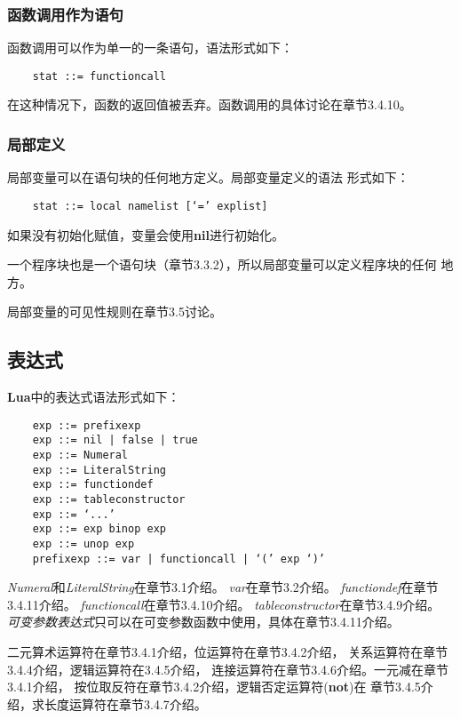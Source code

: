\documentclass{ctexart}
\begin{document}
\subsubsection{函数调用作为语句}

函数调用可以作为单一的一条语句，语法形式如下：

\lstset{language=C}
\begin{lstlisting}
	stat ::= functioncall
\end{lstlisting}

在这种情况下，函数的返回值被丢弃。函数调用的具体讨论在章节3.4.10。

\subsubsection{局部定义}

局部变量可以在语句块的任何地方定义。局部变量定义的语法
形式如下：

\lstset{language=C}
\begin{lstlisting}
	stat ::= local namelist [‘=’ explist]
\end{lstlisting}

如果没有初始化赋值，变量会使用\textbf{nil}进行初始化。

一个程序块也是一个语句块（章节3.3.2），所以局部变量可以定义程序块的任何
地方。

局部变量的可见性规则在章节3.5讨论。

\subsection{表达式}

\textbf{Lua}中的表达式语法形式如下：

\lstset{language=C}
\begin{lstlisting}
	exp ::= prefixexp
	exp ::= nil | false | true
	exp ::= Numeral
	exp ::= LiteralString
	exp ::= functiondef
	exp ::= tableconstructor
	exp ::= ‘...’
	exp ::= exp binop exp
	exp ::= unop exp
	prefixexp ::= var | functioncall | ‘(’ exp ‘)’
\end{lstlisting}

\emph{Numeral}和\emph{LiteralString}在章节3.1介绍。
\emph{var}在章节3.2介绍。
\emph{functiondef}在章节3.4.11介绍。
\emph{functioncall}在章节3.4.10介绍。
\emph{tableconstructor}在章节3.4.9介绍。
\emph{可变参数表达式}只可以在可变参数函数中使用，具体在章节3.4.11介绍。

二元算术运算符在章节3.4.1介绍，位运算符在章节3.4.2介绍，
关系运算符在章节3.4.4介绍，逻辑运算符在3.4.5介绍，
连接运算符在章节3.4.6介绍。一元减在章节3.4.1介绍，
按位取反符在章节3.4.2介绍，逻辑否定运算符(\textbf{not})在
章节3.4.5介绍，求长度运算符在章节3.4.7介绍。
\end{document}

